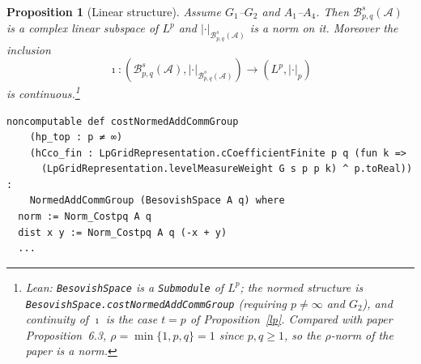 \documentclass[11pt]{amsart}
\newtheorem{proposition}[theorem]{Proposition}
\theoremstyle{definition}
\newcommand{\lean}[1]{\texttt{#1}}
\begin{document}
\begin{proposition}[Linear structure]\label{linear}
Assume $G_1$--$G_2$ and $A_1$--$A_4$. Then
$\mathcal{B}^s_{p,q}(\mathcal{A})$ is a complex linear subspace of $L^p$ and
$|\cdot|_{\mathcal{B}^s_{p,q}(\mathcal{A})}$ is a norm on it. Moreover the
inclusion
$$\imath\colon (\mathcal{B}^s_{p,q}(\mathcal{A}),|\cdot|_{\mathcal{B}^s_{p,q}(\mathcal{A})})\rightarrow (L^p,|\cdot|_p)$$
is continuous.\footnote{Lean: \lean{BesovishSpace} is a \lean{Submodule} of
$L^p$; the normed structure is \lean{BesovishSpace.costNormedAddCommGroup}
(requiring $p \neq \infty$ and $G_2$), and continuity of $\imath$ is the case
$t=p$ of Proposition~\ref{lp}. Compared with paper Proposition~6.3,
$\rho=\min\{1,p,q\}=1$ since $p,q\geq 1$, so the $\rho$-norm of the paper is a
norm.}
\end{proposition}
\begin{lstlisting}[style=lean]
noncomputable def costNormedAddCommGroup
    (hp_top : p ≠ ∞)
    (hCco_fin : LpGridRepresentation.cCoefficientFinite p q (fun k =>
      (LpGridRepresentation.levelMeasureWeight G s p p k) ^ p.toReal)) :
    NormedAddCommGroup (BesovishSpace A q) where
  norm := Norm_Costpq A q
  dist x y := Norm_Costpq A q (-x + y)
  ...
\end{lstlisting}
\end{document}
